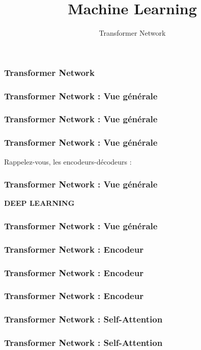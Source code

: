 \documentclass{formation}
\title{Machine Learning}
\subtitle{Transformer Network}
\begin{document}
\maketitle

\begin{frame}
  \frametitle{Transformer Network}
\end{frame}

\begin{frame}
  \frametitle{Transformer Network : Vue générale}
\end{frame}

\begin{frame}
  \frametitle{Transformer Network : Vue générale}
\end{frame}

\begin{frame}
  \frametitle{Transformer Network : Vue générale}
  Rappelez-vous, les encodeurs-décodeurs :
\end{frame}

\begin{frame}
  \frametitle{Transformer Network : Vue générale}
  \textbf{DEEP LEARNING}
\end{frame}

\begin{frame}
  \frametitle{Transformer Network : Vue générale}
\end{frame}

\begin{frame}
  \frametitle{Transformer Network : Encodeur}
\end{frame}

\begin{frame}
  \frametitle{Transformer Network : Encodeur}
\end{frame}

\begin{frame}
  \frametitle{Transformer Network : Encodeur}
\end{frame}

\begin{frame}
  \frametitle{Transformer Network : Self-Attention}
\end{frame}

\begin{frame}
  \frametitle{Transformer Network : Self-Attention}
\end{frame}
\end{document}

